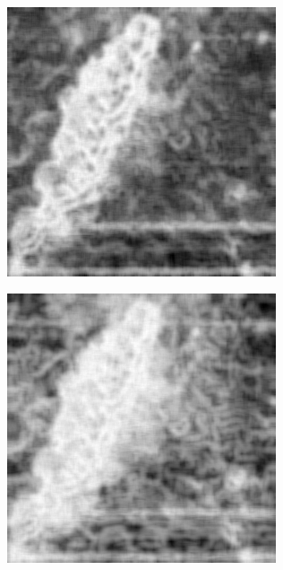 \documentclass[../main.tex]{subfiles}
\begin{document}
\begin{figure}[!ht]
\begin{subfigure}{0.3\linewidth}
	\end{subfigure}
	\hfill
	\begin{subfigure}{0.3\linewidth}
		\centering
		\includegraphics[keepaspectratio, width=\linewidth]{images/nlm_entropy.png}
	\end{subfigure}
	\hfill
	\begin{subfigure}{0.3\linewidth}
		\centering
		\includegraphics[keepaspectratio, width=\linewidth]{images/bm3d_entropy.png}

\end{subfigure}
\end{figure}
\end{document}
